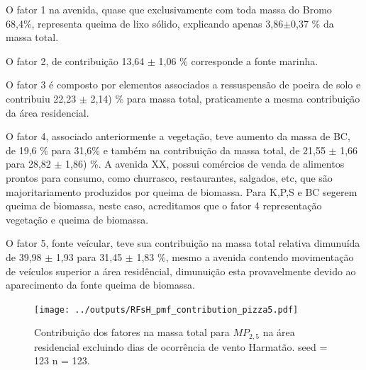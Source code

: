 O fator 1 na avenida, quase que exclusivamente com toda massa do Bromo 68,4\%,
representa queima de lixo sólido, explicando apenas 3,86$\pm$0,37 \% da massa 
total.  

O fator 2, de contribuição 13,64 $\pm$ 1,06 \% corresponde a fonte marinha. 

O fator 3 é composto por elementos associados a ressuspensão de poeira de 
solo e contribuiu 22,23 $\pm$ 2,14) \% para massa total, praticamente
a mesma contribuição da área residencial. 

O fator 4, associado anteriormente a vegetação, teve aumento da massa de BC, 
de 19,6 \% para 31,6\% e também na contribuição da massa total, 
de 21,55 $\pm$ 1,66 para 28,82 $\pm$ 1,86) \%. A avenida XX, possui comércios
de venda de alimentos prontos para consumo, como churrasco, restaurantes, 
salgados, etc, que são majoritariamento produzidos por queima de biomassa. 
Para \citet{reid2005} K,P,S e BC segerem queima de biomassa, neste caso, 
acreditamos que o fator 4 representação vegetação e queima de biomassa.   

O fator 5, fonte veícular, teve sua contribuição na massa total relativa 
dimunuída de 39,98 $\pm$ 1,93 para 31,45 $\pm$ 1,83 \%, mesmo a avenida contendo 
movimentação de veículos superior a área residêncial,
dimunuição esta provavelmente devido ao aparecimento da fonte queima de biomassa. 

\begin{landscape}
  \begin{figure}
    \centering
    \begin{minipage}[b]{0.45\linewidth}
      \texttt{[image: ../outputs/RFsH\_pmf\_contribution\_pizza5.pdf]}
      \caption{Contribuição dos fatores na massa total para $MP_{2,5}$ na área
               residencial excluindo dias de ocorrência de vento Harmatão. seed = 123 n = 123.
               \label{fig:RFsH_contribution5}}
    \end{minipage}%
    \hspace{0.5cm}
    \begin{minipage}[b]{0.45\linewidth}
      
    \end{minipage}
  \end{figure}
\end{landscape}

